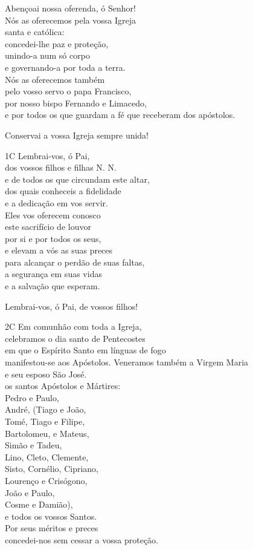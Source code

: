 \documentclass{book}
\begin{document}
\begin{flushleft}
    Abençoai nossa oferenda, ó Senhor! \\

    Nós as oferecemos pela vossa Igreja \\
    santa e católica: \\
    concedei-lhe paz e proteção, \\
    unindo-a num só corpo \\
    e governando-a por toda a terra. \\
    Nós as oferecemos também \\
    pelo vosso servo o papa Francisco, \\
    por nosso bispo Fernando e Limacedo, \\
    e por todos os que guardam a fé que receberam dos apóstolos.

    Conservai a vossa Igreja sempre unida!

    1C Lembrai-vos, ó Pai, \\
    dos vossos filhos e filhas N. N. \\
    e de todos os que circundam este altar, \\
    dos quais conheceis a fidelidade \\
    e a dedicação em vos servir. \\
    Eles vos oferecem conosco \\
    este sacrifício de louvor \\
    por si e por todos os seus, \\
    e elevam a vós as suas preces \\
    para alcançar o perdão de suas faltas, \\
    a segurança em suas vidas \\
    e a salvação que esperam.

    Lembrai-vos, ó Pai, de vossos filhos!

    2C Em comunhão com toda a Igreja, \\
    celebramos o dia santo de Pentecostes \\
    em que o Espírito Santo em línguas de fogo \\
    manifestou-se aos Apóstolos.
    Veneramos também a Virgem Maria \\
    e seu esposo São José. \\
    os santos Apóstolos e Mártires: \\
    Pedro e Paulo, \\
    André, (Tiago e João, \\
    Tomé, Tiago e Filipe, \\
    Bartolomeu, e Mateus, \\
    Simão e Tadeu, \\
    Lino, Cleto, Clemente, \\
    Sisto, Cornélio, Cipriano, \\
    Lourenço e Crisógono, \\
    João e Paulo, \\
    Cosme e Damião), \\
    e todos os vossos Santos. \\
    Por seus méritos e preces \\
    concedei-nos sem cessar a vossa proteção.


\end{flushleft}
\end{document}
